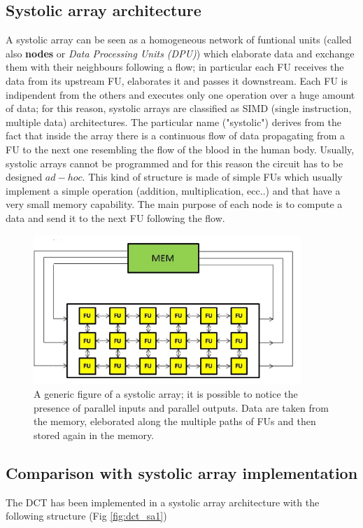 \subsection{Systolic array architecture}
A systolic array can be seen as a homogeneous network of funtional units (called also \textbf{nodes} or \textit{Data Processing Units (DPU)}) which elaborate data and exchange them with their neighbours following a flow; in particular each FU receives the data from its upstream FU, elaborates it and passes it downstream. 
Each FU is indipendent from the others and executes only one operation over a huge amount of data; for this reason, systolic arrays are classified as SIMD (single instruction, multiple data) architectures. 
The particular name ("systolic") derives from the fact that inside the array there is a continuous flow of data propagating from a FU to the next one resembling the flow of the blood in the human body.
Usually, systolic arrays cannot be programmed and for this reason the circuit has to be designed $ ad-hoc $. This kind of structure is made of simple FUs which usually implement a simple operation (addition, multiplication, ecc..) and that have a very small memory capability. The main purpose of each node is to compute a data and send it to the next FU following the flow. \cite{dct2}

\begin{figure}[h!]
	\centering	
	\includegraphics[width=0.9\textwidth]{imm/dct/dct_sa0.png}  
	\caption{ A generic figure of a systolic array; it is possible to notice the presence of parallel inputs and parallel outputs. Data are taken from the memory, eleborated along the multiple paths of FUs and then stored again in the memory.
		} 
	\label{fig:dct_sa0}
\end{figure}
\clearpage
 \subsection{Comparison with systolic array implementation}  \label{DCTSA}
 The DCT has been implemented in a systolic array architecture \cite{dct2} with the following structure (Fig \ref{fig:dct_sa1})
 
